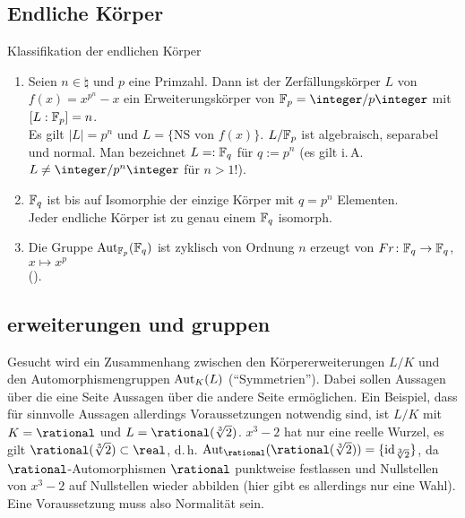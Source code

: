 \subsection{%
    Endliche Körper%
}

\begin{Theorem}{Klassifikation der endlichen Körper}
    \begin{enumerate}[label=(\alph*)]
        \item
        Seien $n \in \natural$ und $p$ eine Primzahl.
        Dann ist der Zerfällungskörper $L$ von $f(x) = x^{p^n} - x$
        ein Erweiterungskörper von $\F_p = \integer/p\integer$ mit
        $[L:\mathbb{F}_p] = n$.\\
        Es gilt $|L| = p^n$ und $L = \{\text{NS von } f(x)\}$.
        $L/\mathbb{F}_p$ ist algebraisch, separabel und normal.
        Man bezeichnet $L =: \mathbb{F}_q$ für $q := p^n$
        (es gilt i.\,A. $L \not= \integer/p^n\integer$ für $n > 1$!).

        \item
        $\mathbb{F}_q$ ist bis auf Isomorphie der einzige Körper mit $q = p^n$
        Elementen.\\
        Jeder endliche Körper ist zu genau einem $\mathbb{F}_q$ isomorph.

        \item
        Die Gruppe $\operatorname{Aut}_{\mathbb{F}_p}(\mathbb{F}_q)$ ist zyklisch von Ordnung $n$
        erzeugt von $Fr\colon \mathbb{F}_q \rightarrow \mathbb{F}_q$, $x \mapsto x^p$\\
        ().
    \end{enumerate}
\end{Theorem}

\subsection{%
    erweiterungen und gruppen%
}

\begin{Bem}
    Gesucht wird ein Zusammenhang zwischen den Körpererweiterungen $L/K$
    und den Automorphismengruppen $\operatorname{Aut}_K(L)$ ("`Symmetrien"').
    Dabei sollen Aussagen über die eine Seite Aussagen über die andere
    Seite ermöglichen.
    Ein Beispiel, dass für sinnvolle Aussagen allerdings Voraussetzungen
    notwendig sind,
    ist $L/K$ mit $K = \rational$ und $L = \rational(\sqrt[3]{2})$.
    $x^3 - 2$ hat nur eine reelle Wurzel, es gilt
    $\rational(\sqrt[3]{2}) \subset \real$, d.\,h.
    $\Aut_\rational(\rational(\sqrt[3]{2})) = \{\id_{\sqrt[3]{2}}\}$,
    da $\rational$-Automorphismen $\rational$ punktweise festlassen und
    Nullstellen von $x^3 - 2$ auf Nullstellen wieder abbilden
    (hier gibt es allerdings nur eine Wahl).
    Eine Voraussetzung muss also Normalität sein.
\end{Bem}

